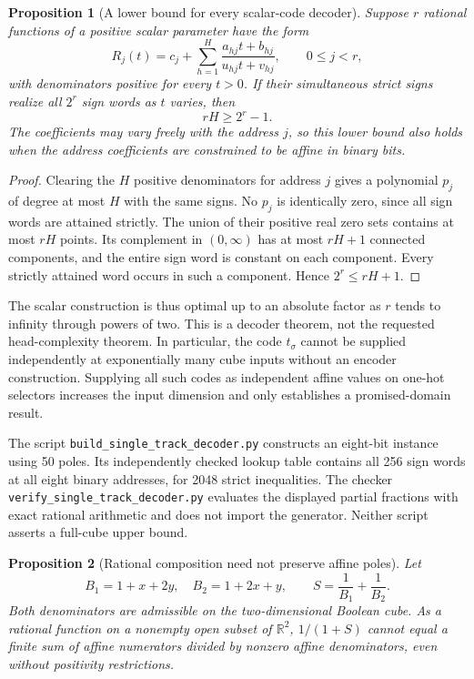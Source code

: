 \documentclass[11pt]{article}
\newtheorem{proposition}{Proposition}
\begin{document}
\begin{proposition}[A lower bound for every scalar-code decoder]
Suppose $r$ rational functions of a positive scalar parameter have the
form
\[
 R_j(t)=c_j+\sum_{h=1}^H
   \frac{a_{hj}t+b_{hj}}{u_{hj}t+v_{hj}},
 \qquad 0\leq j<r,
\]
with denominators positive for every $t>0$. If their simultaneous
strict signs realize all $2^r$ sign words as $t$ varies, then
\[
 rH\geq2^r-1.
\]
The coefficients may vary freely with the address $j$, so this lower
bound also holds when the address coefficients are constrained to be
affine in binary bits.
\end{proposition}

\begin{proof}
Clearing the $H$ positive denominators for address $j$ gives a
polynomial $p_j$ of degree at most $H$ with the same signs. No $p_j$
is identically zero, since all sign words are attained strictly.
The union of their positive real zero sets contains at most $rH$
points. Its complement in $(0,\infty)$ has at most $rH+1$ connected
components, and the entire sign word is constant on each component.
Every strictly attained word occurs in such a component. Hence
$2^r\leq rH+1$.
\end{proof}

The scalar construction is thus optimal up to an absolute factor as
$r$ tends to infinity through powers of two. This is a decoder theorem,
not the requested head-complexity theorem. In particular, the code
$t_\sigma$ cannot be supplied independently at exponentially many cube
inputs without an encoder construction. Supplying all such codes as
independent affine values on one-hot selectors increases the input
dimension and only establishes a promised-domain result.

The script \texttt{build\_single\_track\_decoder.py} constructs an
eight-bit instance using 50 poles. Its independently checked lookup table
contains all 256 sign words at all eight binary addresses, for 2048
strict inequalities. The checker
\texttt{verify\_single\_track\_decoder.py} evaluates the displayed
partial fractions with exact rational arithmetic and does not import
the generator. Neither script asserts a full-cube upper bound.

\begin{proposition}[Rational composition need not preserve affine poles]
Let
\[
 B_1=1+x+2y,\quad B_2=1+2x+y,\qquad
 S=\frac1{B_1}+\frac1{B_2}.
\]
Both denominators are admissible on the two-dimensional Boolean cube.
As a rational function on a nonempty open subset of $\mathbb R^2$,
$1/(1+S)$ cannot equal a finite sum of affine numerators divided by
nonzero affine denominators, even without positivity restrictions.
\end{proposition}
\end{document}
